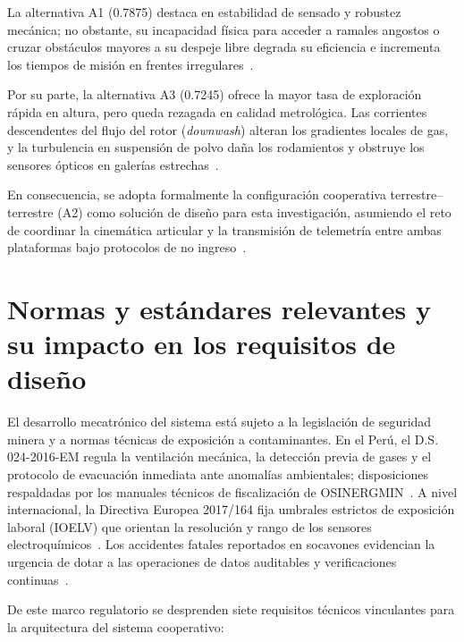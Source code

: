 La alternativa A1 (0.7875) destaca en estabilidad de sensado y robustez mecánica; no obstante, su incapacidad física para acceder a ramales angostos o cruzar obstáculos mayores a su despeje libre degrada su eficiencia e incrementa los tiempos de misión en frentes irregulares~\cite{MINEM_DS024_2016, AdvancesMining_2023}.

Por su parte, la alternativa A3 (0.7245) ofrece la mayor tasa de exploración rápida en altura, pero queda rezagada en calidad metrológica. Las corrientes descendentes del flujo del rotor (\textit{downwash}) alteran los gradientes locales de gas, y la turbulencia en suspensión de polvo daña los rodamientos y obstruye los sensores ópticos en galerías estrechas~\cite{KimChoi_2025_MineMapping, TorresSalazar2021_Diesel, Cortez2016_GEI_Minas}.

En consecuencia, se adopta formalmente la configuración cooperativa terrestre--terrestre (A2) como solución de diseño para esta investigación, asumiendo el reto de coordinar la cinemática articular y la transmisión de telemetría entre ambas plataformas bajo protocolos de no ingreso~\cite{MINEM_DS024_2016, OSINERGMIN_BoletinGSM_Ventilacion_2020}.


\section{Normas y estándares relevantes y su impacto en los requisitos de diseño}

El desarrollo mecatrónico del sistema está sujeto a la legislación de seguridad minera y a normas técnicas de exposición a contaminantes. En el Perú, el D.S. 024-2016-EM regula la ventilación mecánica, la detección previa de gases y el protocolo de evacuación inmediata ante anomalías ambientales; disposiciones respaldadas por los manuales técnicos de fiscalización de OSINERGMIN~\cite{MINEM_DS024_2016, OSINERGMIN_BoletinGSM_Ventilacion_2020}. A nivel internacional, la Directiva Europea 2017/164 fija umbrales estrictos de exposición laboral (IOELV) que orientan la resolución y rango de los sensores electroquímicos~\cite{EU_ExposureDirective_2020}. Los accidentes fatales reportados en socavones evidencian la urgencia de dotar a las operaciones de datos auditables y verificaciones continuas~\cite{MINEM_Yanaquihua_2023}.

De este marco regulatorio se desprenden siete requisitos técnicos vinculantes para la arquitectura del sistema cooperativo:

